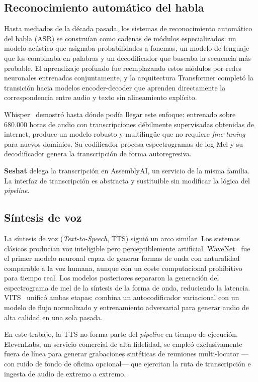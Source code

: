 \subsection{Reconocimiento automático del habla}

Hasta mediados de la década pasada, los sistemas de reconocimiento automático del habla (\ac{ASR})
se construían como cadenas de módulos especializados: un modelo acústico que asignaba
probabilidades a fonemas, un modelo de lenguaje que los combinaba en palabras y un decodificador
que buscaba la secuencia más probable. El aprendizaje profundo fue reemplazando estos módulos por
redes neuronales entrenadas conjuntamente, y la arquitectura Transformer completó la transición
hacia modelos encoder-decoder que aprenden directamente la correspondencia entre audio y texto sin
alineamiento explícito.

Whisper~\cite{radford2023whisper} demostró hasta dónde podía llegar este enfoque: entrenado sobre
680.000 horas de audio con transcripciones débilmente supervisadas obtenidas de internet, produce
un modelo robusto y multilingüe que no requiere \textit{fine-tuning} para nuevos dominios. Su
codificador procesa espectrogramas de log-Mel y su decodificador genera la transcripción de forma
autoregresiva.

\textbf{Seshat} delega la transcripción en AssemblyAI, un servicio de la misma familia. La
interfaz de transcripción es abstracta y sustituible sin modificar la lógica del \textit{pipeline}.

\subsection{Síntesis de voz}

La síntesis de voz (\textit{Text-to-Speech}, TTS) siguió un arco similar. Los sistemas clásicos
producían voz inteligible pero perceptiblemente artificial. WaveNet~\cite{oord2016wavenet} fue el
primer modelo neuronal capaz de generar formas de onda con naturalidad comparable a la voz humana,
aunque con un coste computacional prohibitivo para tiempo real. Los modelos posteriores separaron
la generación del espectrograma de mel de la síntesis de la forma de onda, reduciendo la latencia.
VITS~\cite{kim2021vits} unificó ambas etapas: combina un  autocodificador variacional con un modelo
de flujo normalizado y entrenamiento adversarial para generar audio de alta calidad en una sola pasada.

En este trabajo, la TTS no forma parte del \textit{pipeline} en tiempo de ejecución. ElevenLabs,
un servicio comercial de alta fidelidad, se empleó exclusivamente fuera de línea para generar
grabaciones sintéticas de reuniones multi-locutor —con ruido de fondo de oficina opcional— que
ejercitan la ruta de transcripción e ingesta de audio de extremo a extremo.

